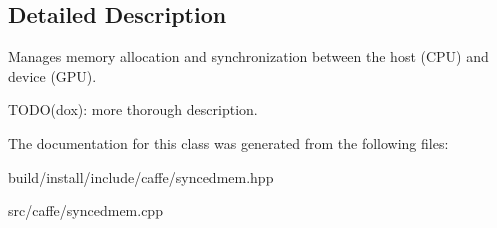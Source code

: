 \subsection{Detailed Description}
Manages memory allocation and synchronization between the host (C\+PU) and device (G\+PU). 

T\+O\+D\+O(dox)\+: more thorough description. 

The documentation for this class was generated from the following files\+:\begin{DoxyCompactItemize}
\item 
build/install/include/caffe/syncedmem.\+hpp\item 
src/caffe/syncedmem.\+cpp\end{DoxyCompactItemize}
